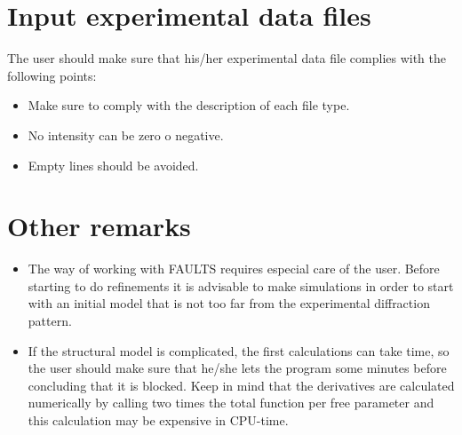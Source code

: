 \section{Input experimental data files}

The user should make sure that his/her experimental data file complies with the following points: 

\begin{itemize}

	\item Make sure to comply with the description of each file type.

	\item No intensity can be zero o negative.

	\item Empty lines should be avoided.

\end{itemize}

\section{Other remarks}

\begin{itemize}

	\item The way of working with FAULTS requires especial care of the user. Before starting to do refinements it is advisable to make simulations in order to start with an initial model that is not too far from the experimental diffraction pattern. 
	
	\item If the structural model is complicated, the first calculations can take time, so the user should make sure that he/she lets the program some minutes before concluding that it is blocked. Keep in mind that the derivatives are calculated numerically by calling two times the total function per free parameter and this calculation may be expensive in CPU-time.

\end{itemize}
 





